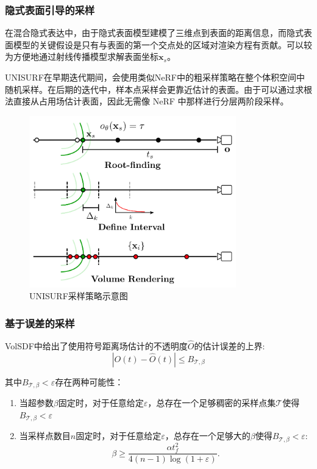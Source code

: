 \subsubsection{隐式表面引导的采样}
在混合隐式表达中，由于隐式表面模型建模了三维点到表面的距离信息，而隐式表面模型的关键假设是只有与表面的第一个交点处的区域对渲染方程有贡献。可以较为方便地通过射线传播模型求解表面坐标$\mathbf{x}_s$\cite{niemeyer_differentiable_2020}。

UNISURF\cite{oechsle_unisurf_2021}在早期迭代期间，会使用类似NeRF中的粗采样策略在整个体积空间中随机采样。在后期的迭代中，样本点采样会更靠近估计的表面。由于可以通过求根法\cite{niemeyer_differentiable_2020}直接从占用场估计表面，因此无需像 NeRF 中那样进行分层两阶段采样。

\begin{figure}[ht]
    \centering
    \includegraphics[width=0.8\textwidth]{undergraduate-thesis/images/related-work/unisurf-sampling.png}
    \caption{UNISURF\cite{oechsle_unisurf_2021}采样策略示意图}
    \label{fig:related-work unisurf-sampling}
\end{figure}

\subsubsection{基于误差的采样}
VolSDF\cite{yariv_volume_2021}中给出了使用符号距离场估计的不透明度$\hat{O}$的估计误差的上界:
\begin{equation}
    |O(t)-\hat{O}(t)|\leq B_{\mathcal{T},\beta}
\end{equation}

其中$B_{\mathcal{T},\beta}<\varepsilon$存在两种可能性：
\begin{enumerate}
    \item 当超参数$\beta$固定时，对于任意给定$\varepsilon$，总存在一个足够稠密的采样点集$\mathcal{T}$使得$B_{\mathcal{T},\beta}<\varepsilon$
    \item 当采样点数目$n$固定时，对于任意给定$\varepsilon$，总存在一个足够大的$\beta$使得$B_{\mathcal{T},\beta}<\varepsilon$:
    \begin{equation}
        \beta\geq\frac{\alpha t_f^2}{4(n-1)\log(1+\varepsilon)}.
        \label{eq: related-work volsdf beta-error}
    \end{equation}
\end{enumerate}

